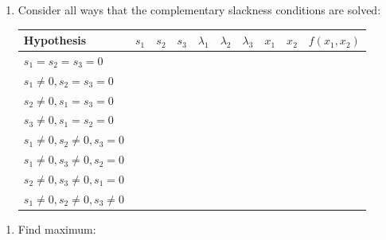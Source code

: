 \documentclass[]{book}
\providecommand{\tightlist}{%
  \setlength{\itemsep}{0pt}\setlength{\parskip}{0pt}}
\theoremstyle{definition}
\theoremstyle{definition}
\theoremstyle{definition}
\theoremstyle{remark}
\begin{document}
\begin{enumerate}
\def\labelenumi{\arabic{enumi}.}
\setcounter{enumi}{3}
\tightlist
\item
  Consider all ways that the complementary slackness conditions are
  solved:

  \begin{center}
  \begin{tabular}{|l|cccccccc|c|}
  \hline
  Hypothesis & $s_1$ & $s_2$ & $s_3$ & $\lambda_1$ & $\lambda_2$ & $\lambda_3$ & $x_1$ & $x_2$ & $f(x_1, x_2)$\\
  \hline
  $s_1 = s_2 = s_3 = 0$ & \multicolumn{8}{l|}{\phantom{No solution}} & \\
  $s_1 \neq 0, s_2 = s_3 = 0$ & \phantom{2} & \phantom{0} & \phantom{0} & \phantom{0} & \phantom{0} & \phantom{0} & \phantom{0} & \phantom{0} & \phantom{0}\\
  $s_2 \neq 0, s_1 = s_3 = 0$ & \phantom{0} & \phantom{2} & \phantom{0} & \phantom{-8} & \phantom{0} & \phantom{-8} & \phantom{4} & \phantom{0} & \phantom{-16}\\
  $s_3 \neq 0, s_1 = s_2 = 0$ & \phantom{0} & \phantom{0} & \phantom{2} & \phantom{-16} & \phantom{-16} & \phantom{0} & \phantom{0} & \phantom{4} & \phantom{-32}\\
  $s_1 \neq 0, s_2 \neq 0, s_3 = 0$ &\multicolumn{8}{l|}{\phantom{No solution}} & \\
  $s_1 \neq 0, s_3 \neq 0, s_2 = 0$ &\multicolumn{8}{l|}{\phantom{No solution}} & \\
  $s_2 \neq 0, s_3 \neq 0, s_1 = 0$ &\phantom{0} & \phantom{$\sqrt{\frac{8}{3}}$} & \phantom{$\sqrt{\frac{4}{3}}$} & \phantom{$-\frac{16}{3}$} & \phantom{0} & \phantom{0} & \phantom{$\frac{8}{3}$}& \phantom{$\frac{4}{3}$} & \phantom{$-\frac{32}{3}$}\\
  $s_1 \neq 0, s_2 \neq 0, s_3 \neq 0$ &\multicolumn{8}{l|}{\phantom{No solution}}& \\
  \hline
  \end{tabular}
  \end{center}
\end{enumerate}


\begin{enumerate}
\def\labelenumi{\arabic{enumi}.}
\setcounter{enumi}{4}
\tightlist
\item
  Find maximum:
  \phantom{Looking at the values of $f(x_1,x_2)$ at the critical points, we see that the constrained maximum is located at $(x_1, x_2) = (0,0)$, which is the same as the unconstrained max.  The constrained minimum is located at $(x_1, x_2) = (0,4)$, while there is no unconstrained minimum for this problem.}
\end{enumerate}
\end{document}

